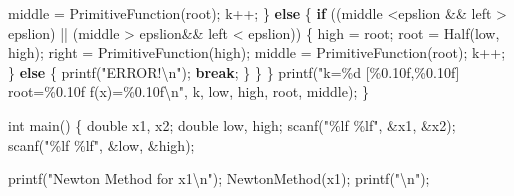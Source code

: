\documentclass[
]{article}
\newenvironment{Shaded}{}{}
\newcommand{\ControlFlowTok}[1]{\textcolor[rgb]{0.00,0.44,0.13}{\textbf{#1}}}
\newcommand{\DataTypeTok}[1]{\textcolor[rgb]{0.56,0.13,0.00}{#1}}
\newcommand{\NormalTok}[1]{#1}
\newcommand{\OperatorTok}[1]{\textcolor[rgb]{0.40,0.40,0.40}{#1}}
\newcommand{\SpecialCharTok}[1]{\textcolor[rgb]{0.25,0.44,0.63}{#1}}
\newcommand{\StringTok}[1]{\textcolor[rgb]{0.25,0.44,0.63}{#1}}
\begin{document}
\begin{Shaded}
\begin{Highlighting}[]
\NormalTok{			middle }\OperatorTok{=}\NormalTok{ PrimitiveFunction}\OperatorTok{(}\NormalTok{root}\OperatorTok{);}
\NormalTok{			k}\OperatorTok{++;}
		\OperatorTok{\}}
		\ControlFlowTok{else}
		\OperatorTok{\{}
			\ControlFlowTok{if} \OperatorTok{((}\NormalTok{middle }\OperatorTok{\textless{}}\NormalTok{epslion }\OperatorTok{\&\&}\NormalTok{ left }\OperatorTok{\textgreater{}}\NormalTok{ epslion}\OperatorTok{)} \OperatorTok{||} \OperatorTok{(}\NormalTok{middle }\OperatorTok{\textgreater{}}\NormalTok{ epslion}\OperatorTok{\&\&}\NormalTok{ left }\OperatorTok{\textless{}}\NormalTok{ epslion}\OperatorTok{))}
			\OperatorTok{\{}
\NormalTok{				high }\OperatorTok{=}\NormalTok{ root}\OperatorTok{;}
\NormalTok{				root }\OperatorTok{=}\NormalTok{ Half}\OperatorTok{(}\NormalTok{low}\OperatorTok{,}\NormalTok{ high}\OperatorTok{);}
\NormalTok{				right }\OperatorTok{=}\NormalTok{ PrimitiveFunction}\OperatorTok{(}\NormalTok{high}\OperatorTok{);}
\NormalTok{				middle }\OperatorTok{=}\NormalTok{ PrimitiveFunction}\OperatorTok{(}\NormalTok{root}\OperatorTok{);}
\NormalTok{				k}\OperatorTok{++;}
			\OperatorTok{\}}
			\ControlFlowTok{else}
			\OperatorTok{\{}
\NormalTok{				printf}\OperatorTok{(}\StringTok{"ERROR!}\SpecialCharTok{\textbackslash{}n}\StringTok{"}\OperatorTok{);}
				\ControlFlowTok{break}\OperatorTok{;}
			\OperatorTok{\}}
		\OperatorTok{\}}
	\OperatorTok{\}}
\NormalTok{	printf}\OperatorTok{(}\StringTok{"k=\%d	[\%0.10f,\%0.10f]		root=\%0.10f		f(x)=\%0.10f}\SpecialCharTok{\textbackslash{}n}\StringTok{"}\OperatorTok{,}\NormalTok{ k}\OperatorTok{,}\NormalTok{ low}\OperatorTok{,}\NormalTok{ high}\OperatorTok{,}\NormalTok{ root}\OperatorTok{,}\NormalTok{ middle}\OperatorTok{);}
\OperatorTok{\}}

\DataTypeTok{int}\NormalTok{ main}\OperatorTok{()}
\OperatorTok{\{}
	\DataTypeTok{double}\NormalTok{ x1}\OperatorTok{,}\NormalTok{ x2}\OperatorTok{;}
	\DataTypeTok{double}\NormalTok{ low}\OperatorTok{,}\NormalTok{ high}\OperatorTok{;}
\NormalTok{	scanf}\OperatorTok{(}\StringTok{"\%lf \%lf"}\OperatorTok{,} \OperatorTok{\&}\NormalTok{x1}\OperatorTok{,} \OperatorTok{\&}\NormalTok{x2}\OperatorTok{);}
\NormalTok{	scanf}\OperatorTok{(}\StringTok{"\%lf \%lf"}\OperatorTok{,} \OperatorTok{\&}\NormalTok{low}\OperatorTok{,} \OperatorTok{\&}\NormalTok{high}\OperatorTok{);}

\NormalTok{	printf}\OperatorTok{(}\StringTok{"Newton Method for x1}\SpecialCharTok{\textbackslash{}n}\StringTok{"}\OperatorTok{);}
\NormalTok{	NewtonMethod}\OperatorTok{(}\NormalTok{x1}\OperatorTok{);}
\NormalTok{	printf}\OperatorTok{(}\StringTok{"}\SpecialCharTok{\textbackslash{}n}\StringTok{"}\OperatorTok{);}


\end{Highlighting}
\end{Shaded}
\end{document}
